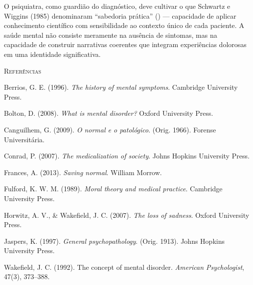 O psiquiatra, como guardião do diagnóstico, deve cultivar o que Schwartz e Wiggins (1985) denominaram \enquote{sabedoria prática} () --- capacidade de aplicar conhecimento científico com sensibilidade ao contexto único de cada paciente. A saúde mental não consiste meramente na ausência de sintomas, mas na capacidade de construir narrativas coerentes que integram experiências dolorosas em uma identidade significativa.

\vspace{2em}
\begin{small}
\noindent\textsc{Referências}

\vspace{1em}
\noindent Berrios, G. E. (1996). \textit{The history of mental symptoms}. Cambridge University Press.

\noindent Bolton, D. (2008). \textit{What is mental disorder?} Oxford University Press.

\noindent Canguilhem, G. (2009). \textit{O normal e o patológico}. (Orig. 1966). Forense Universitária.

\noindent Conrad, P. (2007). \textit{The medicalization of society}. Johns Hopkins University Press.

\noindent Frances, A. (2013). \textit{Saving normal}. William Morrow.

\noindent Fulford, K. W. M. (1989). \textit{Moral theory and medical practice}. Cambridge University Press.

\noindent Horwitz, A. V., \& Wakefield, J. C. (2007). \textit{The loss of sadness}. Oxford University Press.

\noindent Jaspers, K. (1997). \textit{General psychopathology}. (Orig. 1913). Johns Hopkins University Press.

\noindent Wakefield, J. C. (1992). The concept of mental disorder. \textit{American Psychologist}, 47(3), 373--388.
\end{small}
